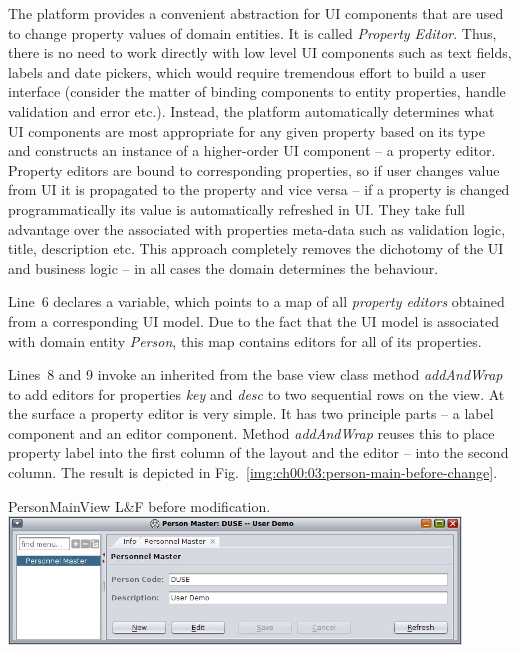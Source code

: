   The platform provides a convenient abstraction for UI components that are used to change property values of domain entities.
  It is called \emph{Property Editor}.
  Thus, there is no need to work directly with low level UI components such as text fields, labels and date pickers, which would require tremendous effort to build a user interface (consider the matter of binding components to entity properties, handle validation and error etc.).
  Instead, the platform automatically determines what UI components are most appropriate for any given property based on its type and constructs an instance of a higher-order UI component -- a property editor.
  Property editors are bound to corresponding properties, so if user changes value from UI it is propagated to the property and vice versa -- if a property is changed programmatically its value is automatically refreshed in UI.
  They take full advantage over the associated with properties meta-data such as validation logic, title, description etc. 
  This approach completely removes the dichotomy of the UI and business logic -- in all cases the domain determines the behaviour.
  
  Line~6 declares a variable, which points to a map of all \emph{property editors} obtained from a corresponding UI model.
  Due to the fact that the UI model is associated with domain entity \emph{Person}, this map contains editors for all of its properties.

  Lines~8 and 9 invoke an inherited from the base view class method \emph{addAndWrap} to add editors for properties \emph{key} and \emph{desc} to two sequential rows on the view.
  At the surface a property editor is very simple.
  It has two principle parts -- a label component and an editor component.
  Method \emph{addAndWrap} reuses this to place property label into the first column of the layout and the editor -- into the second column.
  The result is depicted in Fig.~\ref{img:ch00:03:person-main-before-change}.

  \begin{image}{PersonMainView L\&F before modification.}{\label{img:ch00:03:person-main-before-change}}
    \includegraphics[width=0.9\textwidth]{parts/00-part/chapters/02-making-changes/images/05-person-main-before-change.png}
  \end{image}

